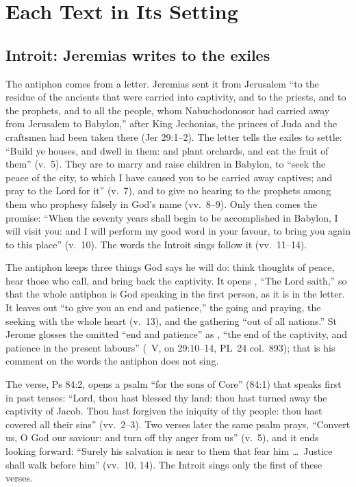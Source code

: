\section{Each Text in Its Setting}
\label{sec:each-element}

\subsection{Introit: Jeremias writes to the exiles}
\label{sec:element-introit}

The antiphon comes from a letter. Jeremias sent it from Jerusalem ``to the
residue of the ancients that were carried into captivity, and to the priests,
and to the prophets, and to all the people, whom Nabuchodonosor had carried
away from Jerusalem to Babylon,'' after King Jechonias, the princes of Juda and
the craftsmen had been taken there (Jer 29:1--2). The letter tells the exiles
to settle: ``Build ye
houses, and dwell in them: and plant orchards, and eat the fruit of them''
(v.~5). They are to marry and raise children in Babylon, to ``seek the peace of
the city, to which I have caused you to be carried away captives; and pray to
the Lord for it'' (v.~7), and to give no hearing to the prophets among them who
prophesy falsely in God's name (vv.~8--9). Only then comes the promise: ``When
the seventy years shall begin to be accomplished in Babylon, I will visit
you: and I will perform my good word in your favour, to bring you again to
this place'' (v.~10). The words the Introit sings follow it (vv.~11--14).

The antiphon keeps three things God says he will do: think thoughts of peace,
hear those who call, and bring back the captivity. It opens , ``The Lord saith,'' so that the whole antiphon is God speaking in the
first person, as it is in the letter. It leaves out ``to give you an end and
patience,'' the going and praying, the seeking with the whole heart (v.~13),
and the gathering ``out of all nations.'' St Jerome glosses the omitted ``end
and patience'' as , ``the end of the captivity, and patience in the present
labours'' (~V, on 29:10--14, PL~24 col.~893); that is his
comment on the words the antiphon does not sing.

The verse, Ps 84:2, opens a psalm ``for the sons of Core'' (84:1) that speaks
first in past tenses: ``Lord, thou hast blessed thy land: thou hast turned away
the captivity of Jacob. Thou hast forgiven the iniquity of thy people: thou
hast covered all their sins'' (vv.~2--3). Two verses later the same psalm
prays, ``Convert us, O God our saviour: and turn off thy anger from us''
(v.~5), and it ends looking forward: ``Surely his salvation is near to them
that fear him \dots\ Justice shall walk before him'' (vv.~10, 14). The Introit
sings only the first of these verses.

